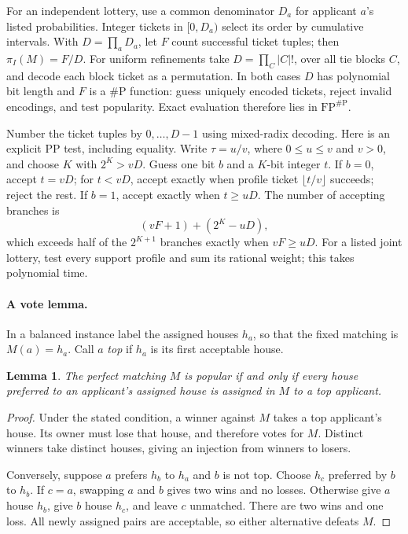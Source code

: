 \documentclass[11pt]{article}
\newtheorem{lemma}{Lemma}
\newcommand{\PP}{\mathrm{PP}}
\newcommand{\FP}{\mathrm{FP}}
\newcommand{\sharpP}{\#\mathrm P}
\begin{document}
For an independent lottery, use a common denominator $D_a$ for applicant $a$'s listed probabilities. Integer tickets in $[0,D_a)$ select its order by cumulative intervals. With $D=\prod_aD_a$, let $F$ count successful ticket tuples; then $\pi_I(M)=F/D$. For uniform refinements take $D=\prod_C |C|!$, over all tie blocks $C$, and decode each block ticket as a permutation. In both cases $D$ has polynomial bit length and $F$ is a $\sharpP$ function: guess uniquely encoded tickets, reject invalid encodings, and test popularity. Exact evaluation therefore lies in $\FP^{\sharpP}$.

Number the ticket tuples by $0,\ldots,D-1$ using mixed-radix decoding. Here is an explicit $\PP$ test, including equality. Write $\tau=u/v$, where $0\leq u\leq v$ and $v>0$, and choose $K$ with $2^K>vD$. Guess one bit $b$ and a $K$-bit integer $t$. If $b=0$, accept $t=vD$; for $t<vD$, accept exactly when profile ticket $\lfloor t/v\rfloor$ succeeds; reject the rest. If $b=1$, accept exactly when $t\geq uD$. The number of accepting branches is
\[
 (vF+1)+(2^K-uD),
\]
which exceeds half of the $2^{K+1}$ branches exactly when $vF\geq uD$. For a listed joint lottery, test every support profile and sum its rational weight; this takes polynomial time.

\paragraph{A vote lemma.}
In a balanced instance label the assigned houses $h_a$, so that the fixed matching is $M(a)=h_a$. Call $a$ \emph{top} if $h_a$ is its first acceptable house.
\begin{lemma}\label{lem:vote}
The perfect matching $M$ is popular if and only if every house preferred to an applicant's assigned house is assigned in $M$ to a top applicant.
\end{lemma}
\begin{proof}
Under the stated condition, a winner against $M$ takes a top applicant's house. Its owner must lose that house, and therefore votes for $M$. Distinct winners take distinct houses, giving an injection from winners to losers.

Conversely, suppose $a$ prefers $h_b$ to $h_a$ and $b$ is not top. Choose $h_c$ preferred by $b$ to $h_b$. If $c=a$, swapping $a$ and $b$ gives two wins and no losses. Otherwise give $a$ house $h_b$, give $b$ house $h_c$, and leave $c$ unmatched. There are two wins and one loss. All newly assigned pairs are acceptable, so either alternative defeats $M$.
\end{proof}
\end{document}
